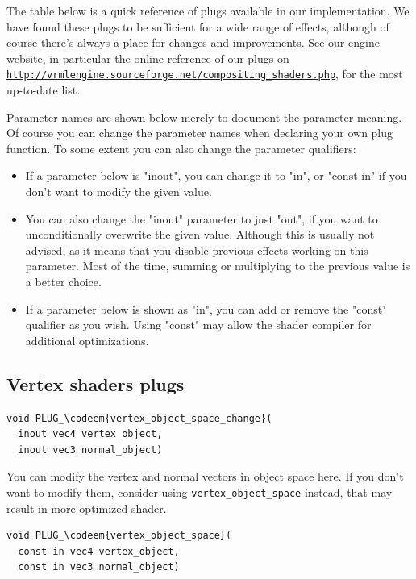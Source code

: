 \documentclass{acmsiggraph}                     %
\newcommand*{\codeem}[1]{\textbf{#1}}
\newcommand*{\myhref}[2]{\texttt{\href{#1}{\nolinkurl{#2}}}}
\begin{document}
The table below is a quick reference of plugs available in our
implementation. We have found these plugs to be sufficient for a wide
range of effects, although of course there's always a place for
changes and improvements. See our engine website,
in particular the online reference of our plugs on
\myhref{http://vrmlengine.sourceforge.net/compositing\_shaders.php}{http://vrmlengine.sourceforge.net/compositing_shaders.php},
for the most up-to-date list.

Parameter names are shown below merely to document the parameter
meaning. Of course you can change the parameter names when declaring
your own plug function. To some extent you can also change the parameter
qualifiers:

\begin{itemize}
  \item If a parameter below is "inout", you can change it to "in", or
    "const in" if you don't want to modify the given value.
  \item You can also change the "inout" parameter to just "out", if
    you want to unconditionally overwrite the given value. Although
    this is usually not advised, as it means that you disable previous
    effects working on this parameter. Most of the time, summing or
    multiplying to the previous value is a better choice.
  \item If a parameter below is shown as "in", you can add or remove
    the "const" qualifier as you wish. Using "const" may allow the
    shader compiler for additional optimizations.
\end{itemize}

\subsection{Vertex shaders plugs}

\begin{Verbatim}[commandchars=\\\{\},frame=single]
void PLUG_\codeem{vertex_object_space_change}(
  inout vec4 vertex_object,
  inout vec3 normal_object)
\end{Verbatim}

You can modify the vertex and normal vectors in object space here.
If you don't want to modify them, consider using \texttt{vertex\_object\_space}
instead, that may result in more optimized shader.

\begin{Verbatim}[commandchars=\\\{\},frame=single]
void PLUG_\codeem{vertex_object_space}(
  const in vec4 vertex_object,
  const in vec3 normal_object)
\end{Verbatim}
\end{document}
